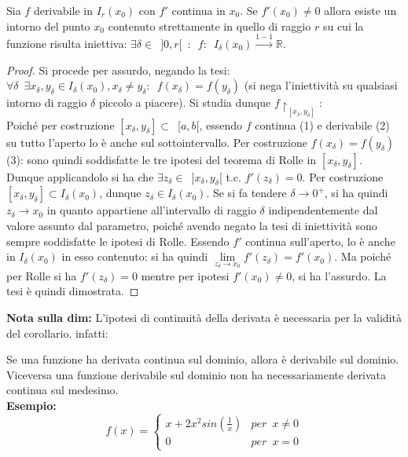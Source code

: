 \documentclass[10pt, oneside]{book}
\theoremstyle{plain}
\begin{document}
\begin{cor} Sia $f$ derivabile in $I_r(x_0)$ con $f'$ continua in $x_0$. Se $f'(x_0) \neq 0$ allora esiste un intorno del punto $x_0$ contenuto strettamente in quello di raggio $r$ su cui la funzione risulta iniettiva: $\exists \delta \in \enspace ]0, r[\enspace : \enspace f: \enspace I_\delta(x_0) \xrightarrow{1-1} \mathbb{R}$.
\end{cor}
\begin{proof}
Si procede per assurdo, negando la tesi: $\forall \delta \enspace \exists x_\delta, y_\delta \in I_\delta(x_0), x_\delta \neq y_\delta : \enspace f(x_\delta) = f(y_\delta)$ (si nega l'iniettività su qualsiasi intorno di raggio $\delta$ piccolo a piacere). Si studia dunque $f\restriction_{[x_\delta, y_\delta]}$: \\Poiché per costruzione $[x_\delta, y_\delta] \subset \enspace [a, b[$, essendo $f$ continua (1) e derivabile (2) su tutto l'aperto lo è anche sul sottointervallo. Per costruzione $f(x_\delta) = f(y_\delta)$ (3): sono quindi soddisfatte le tre ipotesi del teorema di Rolle in $[x_\delta, y_\delta]$. Dunque applicandolo si ha che $\exists z_\delta \in \enspace ]x_\delta, y_\delta[$ t.c. $f'(z_\delta) = 0$. Per costruzione $[x_\delta, y_\delta] \subset I_\delta(x_0)$, dunque $z_\delta \in I_\delta(x_0)$. Se si fa tendere $\delta \rightarrow 0^+$, si ha quindi $z_\delta \rightarrow x_0$ in quanto appartiene all'intervallo di raggio $\delta$ indipendentemente dal valore assunto dal parametro, poiché avendo negato la tesi di iniettività sono sempre soddisfatte le ipotesi di Rolle. Essendo $f'$ continua sull'aperto, lo è anche in $I_\delta(x_0)$ in esso contenuto: si ha quindi $\lim \limits_{z_\delta \rightarrow x_0} f'(z_\delta) = f'(x_0)$. Ma poiché per Rolle si ha $f'(z_\delta) = 0$ mentre per ipotesi $f'(x_0) \neq 0$, si ha l'assurdo. La tesi è quindi dimostrata.
\end{proof}
\textbf{Nota sulla dim:} L'ipotesi di continuità della derivata è necessaria per la validità del corollario. infatti:
\begin{oss} Se una funzione ha derivata continua sul dominio, allora è derivabile sul dominio. Viceversa una funzione derivabile sul dominio non ha necessariamente derivata continua sul medesimo.\\
\textbf{Esempio:}
\[f(x) = \begin{cases}
  x + 2 x^2 sin(\frac{1}{x}) &{per} \enspace x \neq 0 \\
  0 &{per} \enspace x = 0
\end{cases}\]
\end{oss}
\end{document}
